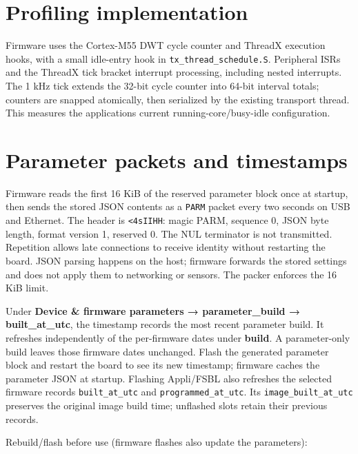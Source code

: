 \documentclass[10pt,a4paper,oneside]{report}
\begin{document}
\section{Profiling implementation}\label{wiki-tools-device-monitor--profiling-implementation}

Firmware uses the Cortex-M55 DWT cycle counter and ThreadX execution hooks, with a small idle-entry hook in \texttt{tx\_\allowbreak{}thread\_\allowbreak{}schedule.\allowbreak{}S}. Peripheral ISRs and the ThreadX tick bracket interrupt processing, including nested interrupts. The 1 kHz tick extends the 32-bit cycle counter into 64-bit interval totals; counters are snapped atomically, then serialized by the existing transport thread. This measures the application\textquotesingle s current running-core/busy-idle configuration.

\section{Parameter packets and timestamps}\label{wiki-tools-device-monitor--parameter-packets-and-timestamps}

Firmware reads the first 16 KiB of the reserved parameter block once at startup, then sends the stored JSON contents as a \texttt{PARM} packet every two seconds on USB and Ethernet. The header is \texttt{<4sIIHH}: magic PARM, sequence 0, JSON byte length, format version 1, reserved 0. The NUL terminator is not transmitted. Repetition allows late connections to receive identity without restarting the board. JSON parsing happens on the host; firmware forwards the stored settings and does not apply them to networking or sensors. The packer enforces the 16 KiB limit.

Under \textbf{Device \& firmware parameters → parameter\_build → built\_at\_utc}, the timestamp records the most recent parameter build. It refreshes independently of the per-firmware dates under \textbf{build}. A parameter-only build leaves those firmware dates unchanged. Flash the generated parameter block and restart the board to see its new timestamp; firmware caches the parameter JSON at startup. Flashing Appli/FSBL also refreshes the selected firmware record\textquotesingle s \texttt{built\_\allowbreak{}at\_\allowbreak{}utc} and \texttt{programmed\_\allowbreak{}at\_\allowbreak{}utc}. Its \texttt{image\_\allowbreak{}built\_\allowbreak{}at\_\allowbreak{}utc} preserves the original image build time; unflashed slots retain their previous records.

Rebuild/flash before use (firmware flashes also update the parameters):
\end{document}
